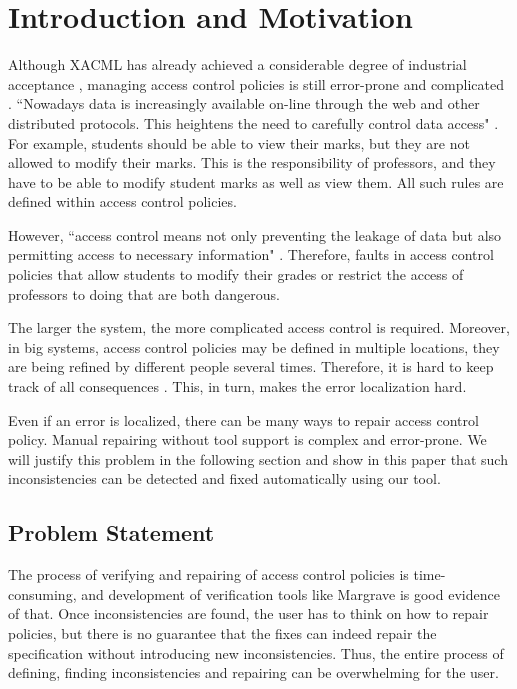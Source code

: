 \documentclass{acm_proc_article-sp}
\begin{document}


\section{Introduction and Motivation}

Although XACML has already achieved a considerable degree of industrial acceptance \cite{acp:alloy}, managing access control policies is still error-prone and complicated \cite{acp:automated}. ``Nowadays data is increasingly available on-line through the web and other distributed protocols. This heightens the need to carefully control data access" \cite{Fisler:2005:VCA:1062455.1062502}. For example, students should be able to view their marks, but they are not allowed to modify their marks. This is the responsibility of professors, and they have to be able to modify student marks as well as view them. All such rules are defined within access control policies.

However, ``access control means not only preventing the leakage of data but also permitting access to necessary information" \cite{Fisler:2005:VCA:1062455.1062502}. Therefore, faults in access control policies that allow students to modify their grades or restrict the access of professors to doing that are both dangerous.

The larger the system, the more complicated access control is required. Moreover, in big systems, access control policies may be defined in multiple locations, they are being refined by different people several times. Therefore, it is hard to keep track of all consequences \cite{Fisler:2005:VCA:1062455.1062502}. This, in turn, makes the error localization hard.

Even if an error is localized, there can be many ways to repair access control policy. Manual repairing without tool support is complex and error-prone. We will justify this problem in the following section and show in this paper that such inconsistencies can be detected and fixed automatically using our tool.

\subsection{Problem Statement}

The process of verifying and repairing of access control policies is time-consuming, and development of verification tools like Margrave \cite{Fisler:2005:VCA:1062455.1062502} is good evidence of that. Once inconsistencies are found, the user has to think on how to repair policies, but there is no guarantee that the fixes can indeed repair the specification without introducing new inconsistencies. Thus, the entire process of defining, finding inconsistencies and repairing can be overwhelming for the user.
\end{document}

